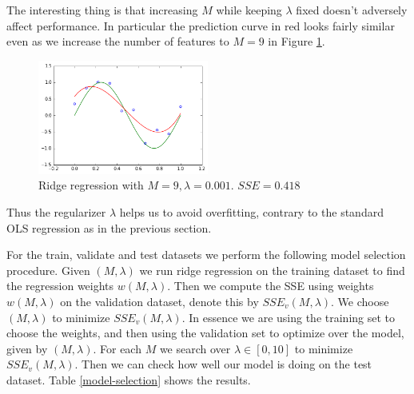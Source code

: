 \documentclass{article}
\begin{document}
The interesting thing is that increasing $M$ while keeping $\lambda$ fixed doesn't adversely affect performance. In particular the prediction curve in red looks fairly similar even as we increase the number of features to $M = 9$ in Figure \ref{ridge_m_9_lam_0-001}. 

\begin{figure}[h]
\centering
\includegraphics[width=0.5\textwidth]{m_3_lam_0-001}
\caption{Ridge regression with $M = 9, \lambda = 0.001$. $SSE = 0.418$}
\label{ridge_m_9_lam_0-001}
\end{figure}

Thus the regularizer $\lambda$ helps us to avoid overfitting, contrary to the standard OLS regression as in the previous section.

For the train, validate and test datasets we perform the following model selection procedure. Given $(M,\lambda)$ we run ridge regression on the training dataset to find the regression weights $w(M,\lambda)$. Then we compute the SSE using weights $w(M,\lambda)$ on the validation dataset, denote this by $SSE_v(M,\lambda)$. We choose $(M,\lambda)$ to minimize $SSE_v(M,\lambda)$. In essence we are using the training set to choose the weights, and then using the validation set to optimize over the model, given by $(M,\lambda)$. For each $M$ we search over $\lambda \in [0,10]$ to minimize $SSE_v(M,\lambda)$. Then we can check how well our model is doing on the test dataset. Table \ref{model-selection} shows the results.
\end{document}
